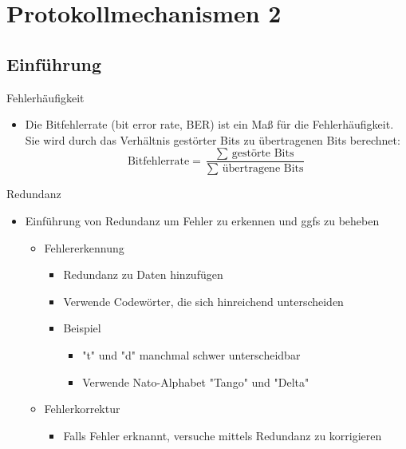 \newpage
\section{Protokollmechanismen 2}
  \subsection{Einführung}
    Fehlerhäufigkeit
    \begin{itemize}
      \item Die Bitfehlerrate (bit error rate, BER) ist ein Maß für die Fehlerhäufigkeit. Sie wird
        durch das Verhältnis gestörter Bits zu übertragenen Bits berechnet:
        $$\text{Bitfehlerrate}=\frac{\sum\text{ gestörte Bits}}{\sum\text{ übertragene Bits}}$$
    \end{itemize}
    Redundanz
    \begin{itemize}
      \item Einführung von Redundanz um Fehler zu erkennen und ggfs zu beheben
        \begin{itemize}
          \item Fehlererkennung
          \begin{itemize}
            \item Redundanz zu Daten hinzufügen
            \item Verwende Codewörter, die sich hinreichend unterscheiden
            \item Beispiel
              \begin{itemize}
                \item "t" und "d" manchmal schwer unterscheidbar
                \item Verwende Nato-Alphabet "Tango" und "Delta"
              \end{itemize}
          \end{itemize}
        \item Fehlerkorrektur
          \begin{itemize}
            \item Falls Fehler erknannt, versuche mittels Redundanz zu korrigieren
          \end{itemize}
        \end{itemize}
    \end{itemize}
